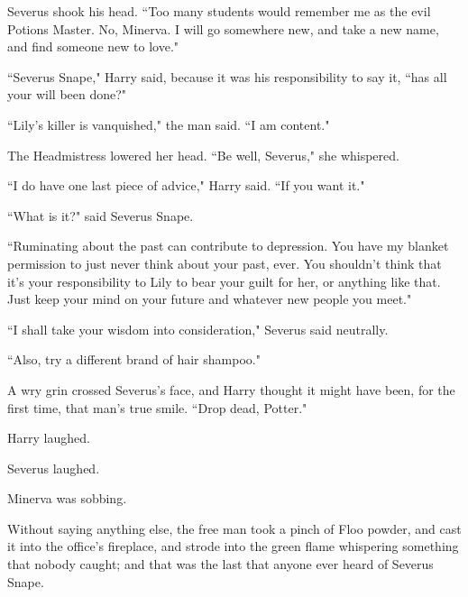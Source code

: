 Severus shook his head. ``Too many students would remember me as the evil Potions Master. No, Minerva. I will go somewhere new, and take a new name, and find someone new to love."

``Severus Snape," Harry said, because it was his responsibility to say it, ``has all your will been done?"

``Lily's killer is vanquished," the man said. ``I am content."

The Headmistress lowered her head. ``Be well, Severus," she whispered.

``I do have one last piece of advice," Harry said. ``If you want it."

``What is it?" said Severus Snape.

``Ruminating about the past can contribute to depression. You have my blanket permission to just never think about your past, ever. You shouldn't think that it's your responsibility to Lily to bear your guilt for her, or anything like that. Just keep your mind on your future and whatever new people you meet."

``I shall take your wisdom into consideration," Severus said neutrally.

``Also, try a different brand of hair shampoo."

A wry grin crossed Severus's face, and Harry thought it might have been, for the first time, that man's true smile. ``Drop dead, Potter."

Harry laughed.

Severus laughed.

Minerva was sobbing.

Without saying anything else, the free man took a pinch of Floo powder, and cast it into the office's fireplace, and strode into the green flame whispering something that nobody caught; and that was the last that anyone ever heard of Severus Snape.
